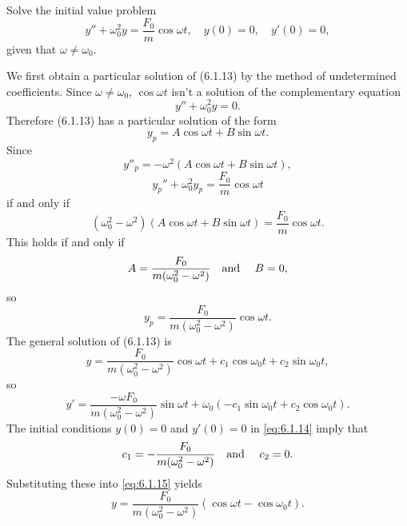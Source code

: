 \setcounter{example}{3}
\setcounter{equation}{13}
\begin{example}
  \label{example:6.1.4}\rm Solve the initial value problem
  \begin{equation}
    \label{eq:6.1.14}y''+\omega_{0}^{2}y=\frac{F_{0}}{m}\cos\omega t,\quad y(0)=0,\quad y'(0)=0,
  \end{equation}
  given that $\omega\ne\omega_{0}$.
\end{example}
\setcounter{equation}{14}
\setcounter{figure}{5}
\begin{examplesolution}
\solution We first obtain a particular solution of \textup{(6.1.13)} by the method of undetermined
coefficients. Since $\omega\ne\omega_{0}$, $\cos\omega t$ isn't a solution of the complementary
equation
\[
  y''+\omega_{0}^{2}y=0.
\]
Therefore \textup{(6.1.13)} has a particular solution of the form
\[
  y_{p}=A\cos\omega t+B\sin\omega t.
\]
Since
\[
  y''_{p}=-\omega^{2}(A\cos\omega t+B\sin\omega t),
\]
\[
  y_{p}''+\omega_{0}^{2}y_{p}=\frac{F_{0}}{m}\cos\omega t
\]
if and only if
\[
  (\omega_{0}^{2}-\omega^{2})\left(A\cos\omega t+ B\sin\omega t\right)=\frac{F_{0}}{m}\cos\omega t.
\]
This holds if and only if
\[
  A=\frac{F_{0}}{m(\omega_{0}^{2}-\omega^{2})}\mbox{\quad and \quad}B=0,
\]
so
\[
  y_{p}=\frac{F_{0}}{m(\omega_{0}^{2}-\omega^{2})}\cos\omega t.
\]
The general solution of \textup{(6.1.13)} is
\begin{equation}
  \label{eq:6.1.15}y=\frac{F_{0}}{m(\omega_{0}^{2}-\omega^{2})}\cos\omega t +c_{1}\cos\omega_{0}t+c_{2}\sin\omega_{0}t,
\end{equation}
so
\[
  y'=\frac{-\omega F_{0}}{m(\omega_{0}^{2}-\omega^{2})}\sin\omega t +\omega_{0}(-c_{1}\sin\omega_{0}t+c_{2}\cos\omega_{0}t).
\]
The initial conditions $y(0)=0$ and $y'(0)=0$ in \eqref{eq:6.1.14} imply that
\[
  c_{1}=-\frac{F_{0}}{m(\omega_{0}^{2}-\omega^{2})}\mbox{\quad and \quad}c_{2}=0.
\]
Substituting these into \eqref{eq:6.1.15} yields
\begin{equation}
  \label{eq:6.1.16}y=\frac{F_{0}}{m(\omega_{0}^{2}-\omega^{2})}(\cos\omega t-\cos\omega_{0}t).
\end{equation}


\end{examplesolution}
